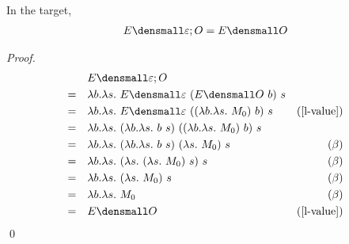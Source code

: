 \begin{lemma}
  \label{thm:ext-compose-id-left}
  In the target,
  \begin{align*}
     E\den{\varepsilon; O} = E\den{O}
  \end{align*}
\end{lemma}
    \begin{proof}
        \begin{align*}
            &\quad E\den{\varepsilon; O} \\
            =& \quad \lambda b. \lambda s.~ E\den{\varepsilon} ~(E\den{O} ~b) ~s \\
            =&  \quad \lambda b. \lambda s.~ E\den{\varepsilon} ~((\lambda b. \lambda s.~ M_0) ~b) ~s & (\cref{l-value})\\
            =& \quad \lambda b. \lambda s.~ (\lambda b. \lambda s.~ b ~s) ~((\lambda b. \lambda s.~ M_0) ~b) ~s \\
            =& \quad \lambda b. \lambda s.~ (\lambda b. \lambda s.~ b ~s) ~(\lambda s.~ M_0) ~s & (\beta)\\
            =& \quad \lambda b. \lambda s.~ (\lambda s.~ (\lambda s.~ M_0) ~s) ~s & (\beta)\\
            =& \quad \lambda b. \lambda s.~ (\lambda s.~ M_0) ~s & (\beta)\\
            =& \quad \lambda b. \lambda s.~ M_0 & (\beta) \\
            =& \quad E\den{O} & (\cref{l-value})
        \end{align*}
        \qed
    \end{proof}

    
